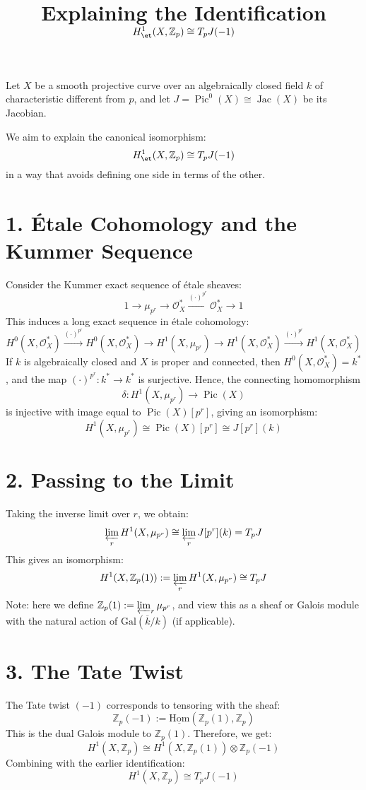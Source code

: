 \documentclass[12pt]{article}
\title{Explaining the Identification \( H^1_{\text{\et}}(X, \mathbb{Z}_p) \cong T_p J(-1) \)}
\author{}
\date{}
\begin{document}
\maketitle

Let \( X \) be a smooth projective curve over an algebraically closed field \( k \) of characteristic different from \( p \), and let \( J = \operatorname{Pic}^0(X) \cong \operatorname{Jac}(X) \) be its Jacobian.

We aim to explain the canonical isomorphism:
\[ 
H^1_{\text{\et}}(X, \mathbb{Z}_p) \cong T_p J(-1)
\]
in a way that avoids defining one side in terms of the other.

\section*{1. Étale Cohomology and the Kummer Sequence}
Consider the Kummer exact sequence of étale sheaves:
\[
1 \to \mu_{p^r} \to \mathcal{O}_X^* \xrightarrow{(\cdot)^{p^r}} \mathcal{O}_X^* \to 1
\]
This induces a long exact sequence in étale cohomology:
\[
H^0(X, \mathcal{O}_X^*) \xrightarrow{(\cdot)^{p^r}} H^0(X, \mathcal{O}_X^*) \to H^1(X, \mu_{p^r}) \to H^1(X, \mathcal{O}_X^*) \xrightarrow{(\cdot)^{p^r}} H^1(X, \mathcal{O}_X^*)
\]
If \( k \) is algebraically closed and \( X \) is proper and connected, then \( H^0(X, \mathcal{O}_X^*) = k^* \), and the map \( (\cdot)^{p^r} \colon k^* \to k^* \) is surjective. Hence, the connecting homomorphism
\[
\delta \colon H^1(X, \mu_{p^r}) \to \operatorname{Pic}(X)
\]
is injective with image equal to \( \operatorname{Pic}(X)[p^r] \), giving an isomorphism:
\[
H^1(X, \mu_{p^r}) \cong \operatorname{Pic}(X)[p^r] \cong J[p^r](k)
\]

\section*{2. Passing to the Limit}
Taking the inverse limit over \( r \), we obtain:
\[
\varprojlim_r H^1(X, \mu_{p^r}) \cong \varprojlim_r J[p^r](k) = T_p J
\]
This gives an isomorphism:
\[
H^1(X, \mathbb{Z}_p(1)) := \varprojlim_r H^1(X, \mu_{p^r}) \cong T_p J
\]
Note: here we define \( \mathbb{Z}_p(1) := \varprojlim_r \mu_{p^r} \), and view this as a sheaf or Galois module with the natural action of \( \mathrm{Gal}(\overline{k}/k) \) (if applicable).

\section*{3. The Tate Twist}
The Tate twist \( (-1) \) corresponds to tensoring with the sheaf:
\[
\mathbb{Z}_p(-1) := \underline{\mathrm{Hom}}(\mathbb{Z}_p(1), \mathbb{Z}_p)
\]
This is the dual Galois module to \( \mathbb{Z}_p(1) \). Therefore, we get:
\[
H^1(X, \mathbb{Z}_p) \cong H^1(X, \mathbb{Z}_p(1)) \otimes \mathbb{Z}_p(-1)
\]
Combining with the earlier identification:
\[
H^1(X, \mathbb{Z}_p) \cong T_p J(-1)
\]
\end{document}
